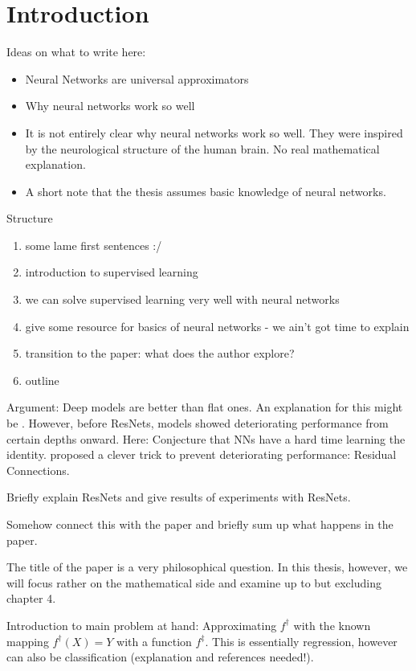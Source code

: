 \section{Introduction}

Ideas on what to write here:
\begin{itemize}
	\item Neural Networks are universal approximators
	\item Why neural networks work so well \cite{lin17}
	\item It is not entirely clear why neural networks work so well. 
	They were inspired by the neurological structure of the human brain.
	No real mathematical explanation.
	\item A short note that the thesis assumes basic knowledge of neural networks.
\end{itemize}
Structure
\begin{enumerate}
	\item some lame first sentences :/
	\item introduction to supervised learning
	\item we can solve supervised learning very well with neural networks
	\item give some resource for basics of neural networks - we ain't got time to explain
	\item transition to the paper: what does the author explore?
	\item outline
\end{enumerate}

Argument:
Deep models are better than flat ones. An explanation for this might be \cite{lin17}.
However, before ResNets, models showed deteriorating performance from certain depths onward.
Here: Conjecture that NNs have a hard time learning the identity.
\cite{he16} proposed a clever trick to prevent deteriorating performance:
Residual Connections.

Briefly explain ResNets and give results of experiments with ResNets.

Somehow connect this with the paper and briefly sum up what happens in the paper.

The title of the paper is a very philosophical question.
In this thesis, however, we will focus rather on the mathematical side and examine \cite{owhadi20} up to but excluding chapter 4.

Introduction to main problem at hand:
Approximating $f^\dagger$ with the known mapping $f^\dagger(X) = Y$ with a function $f^\ddagger$.
This is essentially regression, however can also be classification (explanation and references needed!).

